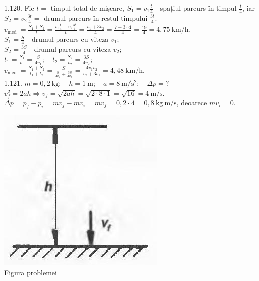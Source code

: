 1.120. Fie $t=$ timpul total de mişcare, $S_{1}=v_{1} \frac{t}{4}$ - spațiul parcurs în timpul $\frac{t}{4}$, iar $S_{2}=v_{2} \frac{3 t}{4}=$ drumul parcurs în restul timpului $\frac{3 t}{4}$.\\ $v_{\text {med }}=\frac{S_{1}+S_{2}}{t}=\frac{v_{1} \frac{t}{4}+v_{2} \frac{3 t}{4}}{t}=\frac{v_{1}+3 v_{2}}{4}=\frac{7+3 \cdot 4}{4}=\frac{19}{4}=4,75 \mathrm{~km} / \mathrm{h}$.\\ $S_{1}=\frac{S}{4}$ - drumul parcurs cu viteza $v_{1}$;\\ $S_{2}=\frac{3 S}{4}$ - drumul parcurs cu viteza $v_{2}$;\\ $t_{1}=\frac{S_{1}}{v_{1}}=\frac{S}{4 v_{1}}; \quad t_{2}=\frac{S_{2}}{v_{2}}=\frac{3 S}{4 v_{2}};$\\ $v_{\text {med }}=\frac{S_{1}+S_{2}}{t_{1}+t_{2}}=\frac{S}{\frac{S}{4 v_{1}}+\frac{3 S}{4 v_{2}}}=\frac{4 v_{1} v_{2}}{v_{2}+3 v_{1}}=4,48 \mathrm{~km} / \mathrm{h}$.\\

1.121. $m=0,2 \mathrm{~kg}; \quad h=1 \mathrm{~m}; \quad a=8 \mathrm{~m} / \mathrm{s}^{2}; \quad \Delta p=$?\\ $v_{f}^{2}=2 a h \Rightarrow v_{f}=\sqrt{2 a h}=\sqrt{2 \cdot 8 \cdot 1}=\sqrt{16}=4 \mathrm{~m} / \mathrm{s}$.\\ $\Delta p=p_{f}-p_{i}=m v_{f}-m v_{i}=m v_{f}=0,2 \cdot 4=0,8 \mathrm{~kg} \mathrm{~m} / \mathrm{s}$, deoarece $m v_{i}=0$.\\ \begin{center} \includegraphics[width=0.4\linewidth]{images/2025_07_01_5b3ff9fa0d508c8e9f17g-223}\\ Figura problemei \end{center}\\

